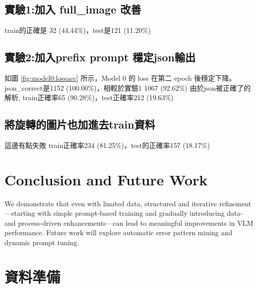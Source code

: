 \documentclass[UTF8, fontset=none]{ctexart}
\begin{document}
\subsection{實驗1:加入 full\_image 改善}
train的正確是 32 (44.44\%)，test是121 (11.20\%)
\subsection{實驗2:加入prefix prompt 穩定json輸出}
如圖 \ref{fig:model0:lossacc} 所示，Model 0 的 loss 在第二 epoch 後穩定下降。
json\_correct是1152 (100.00\%)，相較於實驗1 1067 (92.62\%)
由於json被正確了的解析, train正確率65 (90.28\%)，test正確率212 (19.63\%)
\subsection{將旋轉的圖片也加進去train資料}
這邊有點失敗
train正確率234 (81.25\%)，test的正確率157 (18.17\%)
\section{Conclusion and Future Work}
We demonstrate that even with limited data, structured and iterative refinement---starting with simple prompt-based training and gradually introducing data- and process-driven enhancements---can lead to meaningful improvements in VLM performance. Future work will explore automatic error pattern mining and dynamic prompt tuning.



  

\appendix
\section{資料準備}
\end{document}
